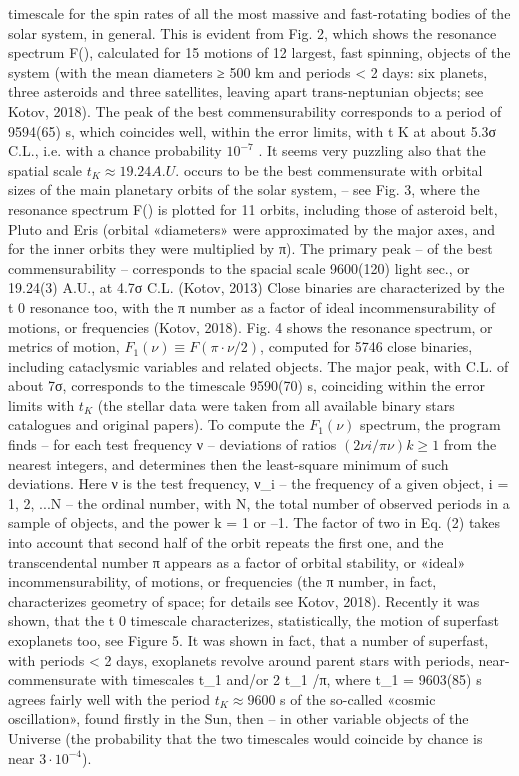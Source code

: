 timescale for the spin rates of all the most massive and fast-rotating bodies of the solar system, in
general.
This is evident from Fig. 2, which shows the resonance spectrum F(\nu), calculated for 15
motions of 12 largest, fast spinning, objects of the system (with the mean diameters ≥ 500 km and
periods < 2 days: six planets, three asteroids and three satellites, leaving apart trans-neptunian
objects; see Kotov, 2018). The peak of the best commensurability corresponds to a period of
9594(65) s, which coincides well, within the error limits, with t K at about 5.3σ C.L., i.e. with a
chance probability $10^{-7}$ .
It seems very puzzling also that the spatial scale $t_{K} \approx 19.24 A.U.$ occurs to be the best
commensurate with orbital sizes of the main planetary orbits of the solar system, – see Fig. 3,
where the resonance spectrum F(\nu) is plotted for 11 orbits, including those of asteroid belt, Pluto
and Eris (orbital «diameters» were approximated by the major axes, and for the inner orbits they
were multiplied by π). The primary peak – of the best commensurability – corresponds to the
spacial scale 9600(120) light sec., or 19.24(3) A.U., at 4.7σ C.L. (Kotov, 2013)
Close binaries are characterized by the t 0 resonance too, with the π number as a factor of ideal
incommensurability of motions, or frequencies (Kotov, 2018). Fig. 4 shows the resonance spectrum,
or metrics of motion, $F_{1} (\nu) \equiv F(\pi \cdot \nu/2)$, computed for 5746 close binaries, including cataclysmic
variables and related objects. The major peak, with C.L. of about 7σ, corresponds to the timescale
9590(70) s, coinciding within the error limits with $t_{K}$ (the stellar data were taken from all available
binary stars catalogues and original papers).
To compute the $F_{1} (\nu)$ spectrum, the program finds – for each test frequency ν – deviations of
ratios $(2\nu i /\pi \nu) k ≥ 1$ from the nearest integers, and determines then the least-square minimum of such
deviations. Here ν is the test frequency, ν_{i} – the frequency of a given object, i = 1, 2, ...N – the
ordinal number, with N, the total number of observed periods in a sample of objects, and the power
k = 1 or –1. The factor of two in Eq. (2) takes into account that second half of the orbit repeats the
first one, and the transcendental number π appears as a factor of orbital stability, or «ideal»
incommensurability, of motions, or frequencies (the π number, in fact, characterizes geometry of
space; for details see Kotov, 2018).
Recently it was shown, that the t 0 timescale characterizes, statistically, the motion of superfast
exoplanets too, see Figure 5.
It was shown in fact, that a number of superfast, with periods < 2 days, exoplanets revolve
around parent stars with periods, near-commensurate with timescales t_{1} and/or 2 t_{1} /π, where t_{1} =
9603(85) s agrees fairly well with the period $t_{K} \approx 9600$ s of the so-called «cosmic oscillation», found
firstly in the Sun, then – in other variable objects of the Universe (the probability that the two
timescales would coincide by chance is near $3 \cdot 10^{-4}$).

